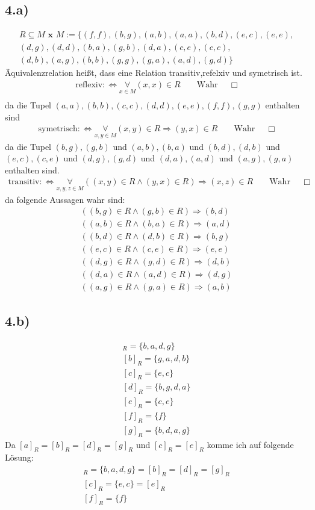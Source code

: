 \documentclass[10pt,ngerman]{scrartcl}
\begin{document}
\subsection{4.a)}
\begin{align*}
 R \subseteq M \textbf{ x } M :=
\{(f , f ), (b, g), (a, b), (a, a), (b, d), (e, c), (e, e),\\
(d, g), (d, d), (b, a), (g, b), (d, a), (c, e), (c, c),\\
(d, b), (a, g), (b, b), (g, g), (g, a), (a, d), (g, d)\}
\end{align*}
Äquivalenzrelation heißt, dass eine Relation transitiv,refelxiv und symetrisch ist.
\begin{align*}
\text{reflexiv}: \Leftrightarrow \underset{x \in M}{\forall} (x,x) \in R && \text{ Wahr}&&\Box\\
\end{align*}
da die Tupel $(a,a),(b,b),(c,c),(d,d),(e,e),(f,f),(g,g)$ enthalten sind
\begin{align*}
\text{symetrisch}: \Leftrightarrow \underset{x,y \in M}{\forall} (x,y) \in R \Rightarrow (y,x) \in R && \text{ Wahr}&& \Box
\end{align*}
da die Tupel $(b,g),(g,b)$ und $(a,b),(b,a)$ und $(b,d),(d,b)$ und $(e,c),(c,e)$ und $(d,g),(g,d)$ und $(d,a),(a,d)$ und $(a,g),(g,a)$ enthalten sind.
\begin{align*}
\text{transitiv}: \Leftrightarrow \underset{x,y,z \in M}{\forall} ((x,y) \in R \wedge (y,x) \in R) \Rightarrow (x,z) \in R && \text{ Wahr}&& \Box
\end{align*}
da folgende Aussagen wahr sind:
\begin{align*}
 ((b,g) \in R \wedge (g,b) \in R) \Rightarrow (b,d)\\
 ((a,b) \in R \wedge (b,a) \in R) \Rightarrow (a,d)\\
 ((b,d) \in R \wedge (d,b) \in R) \Rightarrow (b,g)\\
 ((e,c) \in R \wedge (c,e) \in R) \Rightarrow (e,e)\\
 ((d,g) \in R \wedge (g,d) \in R) \Rightarrow (d,b)\\
 ((d,a) \in R \wedge (a,d) \in R) \Rightarrow (d,g)\\
 ((a,g) \in R \wedge (g,a) \in R) \Rightarrow (a,b)
\end{align*}
\subsection{4.b)}
\begin{align*}
[a]_R = \{b,a,d,g\}\\
[b]_R = \{g,a,d,b\}\\
[c]_R = \{e,c\}\\
[d]_R = \{b,g,d,a\}\\
[e]_R = \{c,e\}\\
[f]_R = \{f\}\\
[g]_R = \{b,d,a,g\}
\end{align*}
Da $[a]_R = [b]_R = [d]_R = [g]_R$ und $[c]_R = [e]_R$ komme ich auf folgende Lösung:
\begin{align*}
 [a]_R = \{b,a,d,g\} = [b]_R = [d]_R = [g]_R\\
 [c]_R = \{e,c\} = [e]_R\\
 [f]_R = \{f\}
\end{align*}
\end{document}
